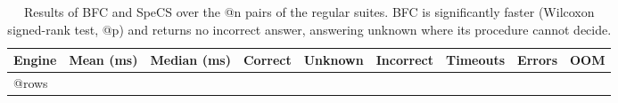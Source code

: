 \begin{table}[t]
  \centering
  \small
  \caption{Results of \acs{BFC} and SpeCS over the @n pairs of the regular suites.
\acs{BFC} is significantly faster (Wilcoxon signed-rank test, @p) and returns no incorrect answer, answering unknown where its procedure cannot decide.}
  \label{fig:regular_bfc_specs}
  \begin{tabular}{lrrrrrrrr}
    \toprule
    Engine & Mean (ms) & Median (ms) & Correct & Unknown & Incorrect & Timeouts & Errors & OOM \\
    \midrule
@rows
    \bottomrule
  \end{tabular}
\end{table}
